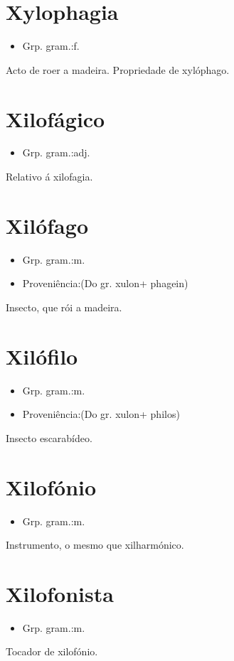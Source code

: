 \section{Xylophagia}
\begin{itemize}
\item {Grp. gram.:f.}
\end{itemize}
Acto de roer a madeira.
Propriedade de xylóphago.
\section{Xilofágico}
\begin{itemize}
\item {Grp. gram.:adj.}
\end{itemize}
Relativo á xilofagia.
\section{Xilófago}
\begin{itemize}
\item {Grp. gram.:m.}
\end{itemize}
\begin{itemize}
\item {Proveniência:(Do gr. \textunderscore xulon\textunderscore  + \textunderscore phagein\textunderscore )}
\end{itemize}
Insecto, que rói a madeira.
\section{Xilófilo}
\begin{itemize}
\item {Grp. gram.:m.}
\end{itemize}
\begin{itemize}
\item {Proveniência:(Do gr. \textunderscore xulon\textunderscore  + \textunderscore philos\textunderscore )}
\end{itemize}
Insecto escarabídeo.
\section{Xilofónio}
\begin{itemize}
\item {Grp. gram.:m.}
\end{itemize}
Instrumento, o mesmo que \textunderscore xilharmónico\textunderscore .
\section{Xilofonista}
\begin{itemize}
\item {Grp. gram.:m.}
\end{itemize}
Tocador de xilofónio.
